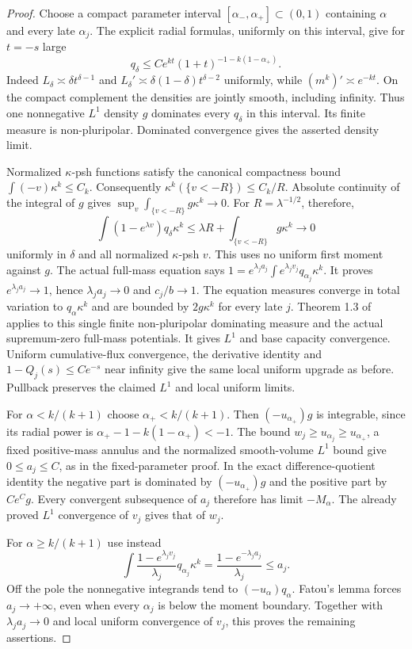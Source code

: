 \documentclass[11pt]{article}
\theoremstyle{remark}\newtheorem{remark}[theorem]{Remark}
\begin{document}
\begin{proof}
Choose a compact parameter interval $[\alpha_-,\alpha_+]\subset(0,1)$
containing $\alpha$ and every late $\alpha_j$. The explicit radial formulas,
uniformly on this interval, give for $t=-s$ large
\[
 q_\delta\leq C e^{kt}(1+t)^{-1-k(1-\alpha_+)}.
\]
Indeed $L_\delta\asymp\delta t^{\delta-1}$ and
$L_\delta'\asymp\delta(1-\delta)t^{\delta-2}$ uniformly, while
$(m^k)'\asymp e^{-kt}$. On the compact complement the densities are
jointly smooth, including infinity. Thus one nonnegative $L^1$ density
$g$ dominates every $q_\delta$ in this interval. Its finite measure
is non-pluripolar. Dominated convergence gives the asserted density limit.

Normalized $\kappa$-psh functions satisfy the canonical compactness bound
$\int(-v)\kappa^k\leq C_k$. Consequently
$\kappa^k(\{v<-R\})\leq C_k/R$. Absolute continuity of the integral of
$g$ gives $\sup_v\int_{\{v<-R\}}g\kappa^k\to0$.
For $R=\lambda^{-1/2}$, therefore,
\[
 \int(1-e^{\lambda v})q_\delta\kappa^k
 \leq\lambda R+\int_{\{v<-R\}}g\kappa^k\longrightarrow0
\]
uniformly in $\delta$ and all normalized $\kappa$-psh $v$.
This uses no uniform first moment against $g$.
The actual full-mass equation says
$1=e^{\lambda_j a_j}\int e^{\lambda_j v_j}q_{\alpha_j}\kappa^k$.
It proves $e^{\lambda_j a_j}\to1$, hence $\lambda_j a_j\to0$ and
$c_j/b\to1$. The equation measures converge in total variation to
$q_\alpha\kappa^k$ and are bounded by $2g\kappa^k$ for every late $j$.
Theorem 1.3 of \cite{Dinew} applies to this single finite non-pluripolar
dominating measure and the actual supremum-zero full-mass potentials.
It gives $L^1$ and base capacity convergence.
Uniform cumulative-flux convergence, the derivative identity and
$1-Q_j(s)\leq Ce^{-s}$ near infinity give the same local uniform upgrade
as before. Pullback preserves the claimed $L^1$ and local uniform limits.

For $\alpha<k/(k+1)$ choose $\alpha_+<k/(k+1)$.
Then $(-u_{\alpha_+})g$ is integrable, since its radial power is
$\alpha_+-1-k(1-\alpha_+)<-1$.
The bound $w_j\geq u_{\alpha_j}\geq u_{\alpha_+}$, a fixed positive-mass
annulus and the normalized smooth-volume $L^1$ bound give
$0\leq a_j\leq C$, as in the fixed-parameter proof.
In the exact difference-quotient identity the negative part is
dominated by $(-u_{\alpha_+})g$ and the positive part by $Ce^C g$.
Every convergent subsequence of $a_j$ therefore has limit $-M_\alpha$.
The already proved $L^1$ convergence of $v_j$ gives that of $w_j$.

For $\alpha\geq k/(k+1)$ use instead
\[
 \int\frac{1-e^{\lambda_j v_j}}{\lambda_j}q_{\alpha_j}\kappa^k
 =\frac{1-e^{-\lambda_j a_j}}{\lambda_j}\leq a_j.
\]
Off the pole the nonnegative integrands tend to
$(-u_\alpha)q_\alpha$. Fatou's lemma forces $a_j\to+\infty$, even when
every $\alpha_j$ is below the moment boundary.
Together with $\lambda_j a_j\to0$ and local uniform convergence of
$v_j$, this proves the remaining assertions.
\end{proof}
\end{document}

